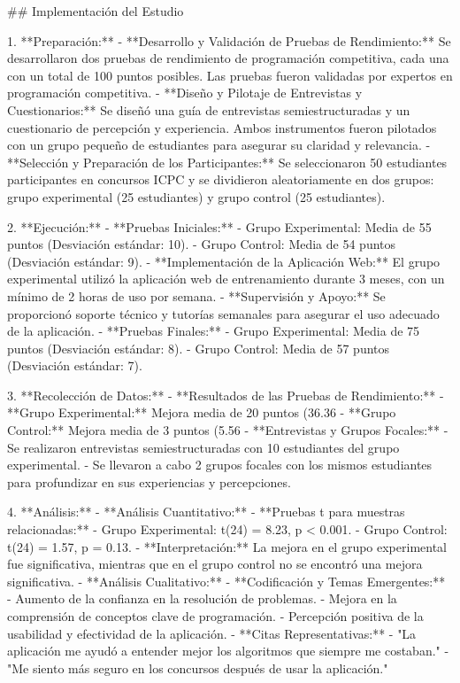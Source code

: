 \begin{markdown}
## Implementación del Estudio

1. **Preparación:**
   - **Desarrollo y Validación de Pruebas de Rendimiento:** Se desarrollaron dos pruebas de rendimiento de programación competitiva, cada una con un total de 100 puntos posibles. Las pruebas fueron validadas por expertos en programación competitiva.
   - **Diseño y Pilotaje de Entrevistas y Cuestionarios:** Se diseñó una guía de entrevistas semiestructuradas y un cuestionario de percepción y experiencia. Ambos instrumentos fueron pilotados con un grupo pequeño de estudiantes para asegurar su claridad y relevancia.
   - **Selección y Preparación de los Participantes:** Se seleccionaron 50 estudiantes participantes en concursos ICPC y se dividieron aleatoriamente en dos grupos: grupo experimental (25 estudiantes) y grupo control (25 estudiantes).

2. **Ejecución:**
   - **Pruebas Iniciales:**
     - Grupo Experimental: Media de 55 puntos (Desviación estándar: 10).
     - Grupo Control: Media de 54 puntos (Desviación estándar: 9).
   - **Implementación de la Aplicación Web:** El grupo experimental utilizó la aplicación web de entrenamiento durante 3 meses, con un mínimo de 2 horas de uso por semana.
   - **Supervisión y Apoyo:** Se proporcionó soporte técnico y tutorías semanales para asegurar el uso adecuado de la aplicación.
   - **Pruebas Finales:**
     - Grupo Experimental: Media de 75 puntos (Desviación estándar: 8).
     - Grupo Control: Media de 57 puntos (Desviación estándar: 7).

3. **Recolección de Datos:**
   - **Resultados de las Pruebas de Rendimiento:**
     - **Grupo Experimental:** Mejora media de 20 puntos (36.36%
     - **Grupo Control:** Mejora media de 3 puntos (5.56%
   - **Entrevistas y Grupos Focales:**
     - Se realizaron entrevistas semiestructuradas con 10 estudiantes del grupo experimental.
     - Se llevaron a cabo 2 grupos focales con los mismos estudiantes para profundizar en sus experiencias y percepciones.

4. **Análisis:**
   - **Análisis Cuantitativo:**
     - **Pruebas t para muestras relacionadas:**
       - Grupo Experimental: t(24) = 8.23, p < 0.001.
       - Grupo Control: t(24) = 1.57, p = 0.13.
     - **Interpretación:** La mejora en el grupo experimental fue significativa, mientras que en el grupo control no se encontró una mejora significativa.
   - **Análisis Cualitativo:**
     - **Codificación y Temas Emergentes:**
       - Aumento de la confianza en la resolución de problemas.
       - Mejora en la comprensión de conceptos clave de programación.
       - Percepción positiva de la usabilidad y efectividad de la aplicación.
     - **Citas Representativas:**
       - "La aplicación me ayudó a entender mejor los algoritmos que siempre me costaban."
       - "Me siento más seguro en los concursos después de usar la aplicación."


\end{markdown}
